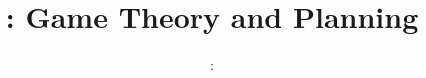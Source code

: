 \usepackage{../../beamerthemeFalmouthGamesAcademy}
\usepackage{multimedia}
\graphicspath{ {../../} }


\usepackage[normalem]{ulem}
\usepackage{wasysym}

\usepackage{pdfpages}

\usetikzlibrary{arrows,automata}

\usepackage{qtree}
\usepackage{algorithm}
\usepackage{algpseudocode}




\title{\sessionnumber: Game Theory and Planning}
\subtitle{\modulecode: \moduletitle}

\frame{\titlepage} 






